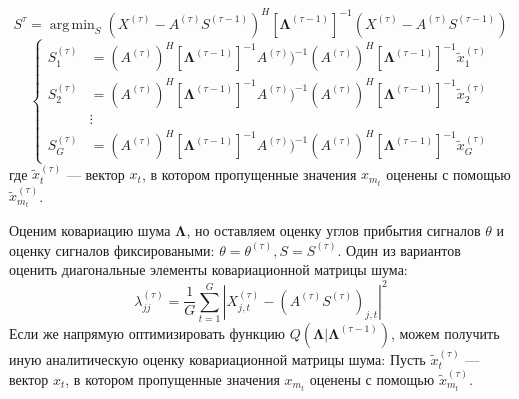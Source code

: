 \documentclass[11pt]{article}
\DeclareMathOperator*{\argmin}{arg\,min}
\begin{document}
\begin{equation}
S^{\tau} = \argmin_S(X^{(\tau)}-A^{(\tau)}S^{(\tau-1)})^H[\mathbf{\Lambda}^{(\tau-1)}]^{-1}(X^{(\tau)}-A^{(\tau)}S^{(\tau-1)})
\end{equation}
\begin{equation}
\left\{
\begin{aligned}
S_1^{(\tau)} &= (A^{(\tau)})^H [\mathbf{\Lambda}^{(\tau-1)}]^{-1} A^{(\tau)})^{-1}(A^{(\tau)})^H [\mathbf{\Lambda}^{(\tau-1)}]^{-1}  \widetilde{x}_1^{(\tau)} \\
S_2^{(\tau)} &= (A^{(\tau)})^H [\mathbf{\Lambda}^{(\tau-1)}]^{-1} A^{(\tau)})^{-1}(A^{(\tau)})^H [\mathbf{\Lambda}^{(\tau-1)}]^{-1}  \widetilde{x}_2^{(\tau)} \\
&\vdots \\
S_G^{(\tau)} &= (A^{(\tau)})^H [\mathbf{\Lambda}^{(\tau-1)}]^{-1} A^{(\tau)})^{-1}(A^{(\tau)})^H [\mathbf{\Lambda}^{(\tau-1)}]^{-1}  \widetilde{x}_G^{(\tau)}
\end{aligned}
\right.
\end{equation}
где $\widetilde{x}_t^{(\tau)}$ --- вектор $x_t$, в котором пропущенные значения $x_{m_t}$ оценены с помощью $\widetilde{x}_{m_t}^{(\tau)}$.
\begin{center}
\fontsize{14}{18}\selectfont {}
\end{center}
Оценим  ковариацию шума $\mathbf{\Lambda}$, но оставляем оценку углов прибытия сигналов $\theta$ и оценку сигналов фиксироваными: $\theta = \theta^{(\tau)}, S = S^{(\tau)}$.
Один из вариантов оценить диагональные элементы ковариационной матрицы шума:
\begin{equation}
\lambda^{(\tau)}_{jj} = \frac{1}{G} \sum_{t=1}^G |X^{(\tau)}_{j,t} - (A^{(\tau)}S^{(\tau)})_{j,t}|^2
\end{equation}
Если же напрямую оптимизировать функцию $Q(\mathbf{\Lambda} | \mathbf{\Lambda}^{(\tau-1)})$, можем получить иную аналитическую оценку ковариационной матрицы шума:
Пусть $\widetilde{x}_t^{(\tau)}$ --- вектор $x_t$, в котором пропущенные значения $x_{m_t}$ оценены с помощью $\widetilde{x}_{m_t}^{(\tau)}$.
\end{document}
